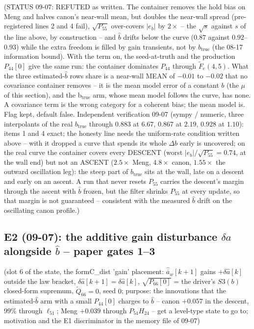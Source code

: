 \documentclass[11pt,a4paper,fontset=none]{ctexart}
\newcommand{\ba}{\bar{a}}
\begin{document}
(STATUS 09-07: REFUTED as written. The container removes the hold bias on Meng and halves canon's near-wall mean, but doubles the
near-wall spread (pre-registered lines 2 and 4 fail), $\sqrt{P_{55}}$ over-covers $|e_b|$ by $2\times$ -- the $\sqrt{s}$ against $s$ of the
line above, by construction -- and $\hat b$ drifts below the curve ($0.87$ against $0.92$--$0.93$) while the extra freedom is filled by
gain transients, not by $b_{\mathrm{true}}$ (the 08-17 information bound). With the term on, the seed-at-truth and the production
$P_{44}[0]$ give the same run: the container dominates $P_{44}$ through $\tilde F_e(4,5)$. What the three estimated-$\hat b$ rows share is a
near-wall MEAN of $-0.01$ to $-0.02$ that no covariance container removes -- it is the mean model error of a constant $b$
(the $\mu$ of this section), and the b$_{\mathrm{true}}$ arm, whose mean model follows the curve, has none. A covariance term is the
wrong category for a coherent bias; the mean model is. Flag kept, default false.
Independent verification 09-07 (sympy / numeric, three interpolants of the real $b_{\mathrm{true}}$ through $0.883$ at $6.67$, $0.867$ at $2.19$,
$0.928$ at $1.10$): items 1 and 4 exact; the honesty line needs the uniform-rate condition written above -- with it dropped a curve that
spends its whole $\Delta b$ early is uncovered; on the real curve the container covers every DESCENT (worst $|e_b|/\sqrt{P_{55}} = 0.74$,
at the wall end) but not an ASCENT ($2.5\times$ Meng, $4.8\times$ canon, $1.55\times$ the outward oscillation leg): the steep part of
$b_{\mathrm{true}}$ sits at the wall, late on a descent and early on an ascent. A run that never resets $P_{55}$ carries the descent's
margin through the ascent with $\hat b$ frozen, but the filter shrinks $P_{55}$ at every update, so that margin is not guaranteed --
consistent with the measured $\hat b$ drift on the oscillating canon profile.)

\subsection*{E2 (09-07): the additive gain disturbance $\delta a$ alongside $\hat b$ -- paper gates 1--3}

(slot 6 of the state, the formC\_dist 'gain' placement: $\hat{\ba}_w[k+1]$ gains $+\delta\hat a[k]$ outside the law bracket, $\delta\hat a[k+1] = \delta\hat a[k]$,
$\sqrt{P_{66}[0]}$ = the driver's $S3(b)$ closed-form supremum, $\tilde Q_{66} = 0$, seed $0$; purpose: the innovations that the
estimated-$\hat b$ arm with a small $P_{44}[0]$ charges to $\hat b$ -- canon $+0.057$ in the descent, $99\%$ through $\ell_{51}$; Meng $+0.039$
through $P_{54}H_{24}$ -- get a level-type state to go to; motivation and the E1 discriminator in the memory file of 09-07)
\end{document}
